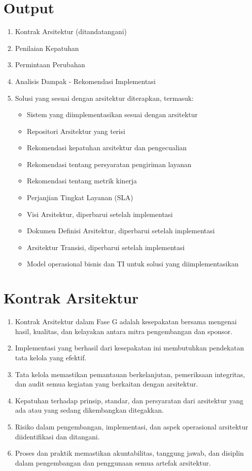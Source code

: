 \section{Output}
\begin{enumerate}
	\item Kontrak Arsitektur (ditandatangani)
	\item Penilaian Kepatuhan
	\item Permintaan Perubahan
	\item Analisis Dampak - Rekomendasi Implementasi
	\item Solusi yang sesuai dengan arsitektur diterapkan, termasuk:
	\begin{itemize}
		\item Sistem yang diimplementasikan sesuai dengan arsitektur
		\item Repositori Arsitektur yang terisi
		\item Rekomendasi kepatuhan arsitektur dan pengecualian
		\item Rekomendasi tentang persyaratan pengiriman layanan
		\item Rekomendasi tentang metrik kinerja
		\item Perjanjian Tingkat Layanan (SLA)
		\item Visi Arsitektur, diperbarui setelah implementasi
		\item Dokumen Definisi Arsitektur, diperbarui setelah implementasi
		\item Arsitektur Transisi, diperbarui setelah implementasi
		\item Model operasional bisnis dan TI untuk solusi yang diimplementasikan
	\end{itemize}
\end{enumerate}

\section{Kontrak Arsitektur}
\begin{enumerate}
	\item Kontrak Arsitektur dalam Fase G adalah kesepakatan bersama mengenai hasil, kualitas, dan kelayakan antara mitra pengembangan dan sponsor.
	\item Implementasi yang berhasil dari kesepakatan ini membutuhkan pendekatan tata kelola yang efektif.
	\item Tata kelola memastikan pemantauan berkelanjutan, pemeriksaan integritas, dan audit semua kegiatan yang berkaitan dengan arsitektur.
	\item Kepatuhan terhadap prinsip, standar, dan persyaratan dari arsitektur yang ada atau yang sedang dikembangkan ditegakkan.
	\item Risiko dalam pengembangan, implementasi, dan aspek operasional arsitektur diidentifikasi dan ditangani.
	\item Proses dan praktik memastikan akuntabilitas, tanggung jawab, dan disiplin dalam pengembangan dan penggunaan semua artefak arsitektur.
\end{enumerate}

